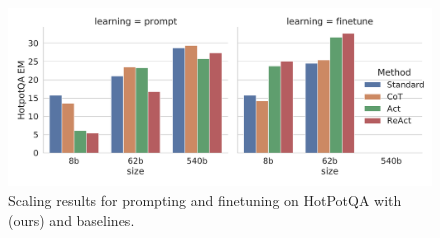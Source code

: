 \begin{figure}[t]
    \centering
\includegraphics[width=.76\textwidth]{iclr2023/figure/hotpot_finetune.pdf}
\vspace{-5pt}
    \caption{Scaling results for prompting and finetuning on HotPotQA with \model{} (ours) and  baselines.}
    \label{fig:finetune}
    \vspace{-12pt}
\end{figure}

